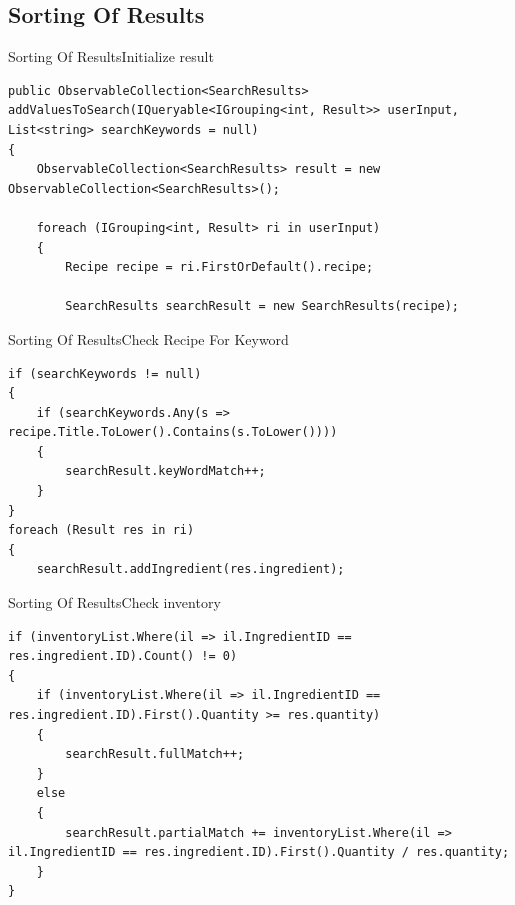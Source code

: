 
\subsection{Sorting Of Results}
\begin{frame}[fragile]{Sorting Of Results}{Initialize result}
\begin{lstlisting}
public ObservableCollection<SearchResults> addValuesToSearch(IQueryable<IGrouping<int, Result>> userInput, List<string> searchKeywords = null)
{
    ObservableCollection<SearchResults> result = new ObservableCollection<SearchResults>();

    foreach (IGrouping<int, Result> ri in userInput)
    {
        Recipe recipe = ri.FirstOrDefault().recipe;

        SearchResults searchResult = new SearchResults(recipe);
\end{lstlisting}
\end{frame}

\begin{frame}[fragile]{Sorting Of Results}{Check Recipe For Keyword}
\begin{lstlisting}
if (searchKeywords != null)
{
    if (searchKeywords.Any(s => recipe.Title.ToLower().Contains(s.ToLower())))
    {
        searchResult.keyWordMatch++;
    }
}
foreach (Result res in ri)
{
    searchResult.addIngredient(res.ingredient);
\end{lstlisting}
\end{frame}

\begin{frame}[fragile]{Sorting Of Results}{Check inventory}
\begin{lstlisting}
if (inventoryList.Where(il => il.IngredientID == res.ingredient.ID).Count() != 0)
{
    if (inventoryList.Where(il => il.IngredientID == res.ingredient.ID).First().Quantity >= res.quantity)
    {
        searchResult.fullMatch++;
    }
    else
    {
        searchResult.partialMatch += inventoryList.Where(il => il.IngredientID == res.ingredient.ID).First().Quantity / res.quantity;
    }
}
\end{lstlisting}
\end{frame}

